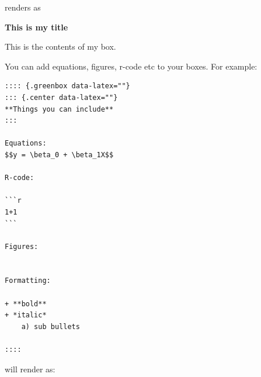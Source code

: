 \documentclass[
  british,
  oneside]{krantz}
\theoremstyle{definition}
\theoremstyle{definition}
\theoremstyle{definition}
\theoremstyle{definition}
\theoremstyle{remark}
\begin{document}
renders as

\begin{palebluebox}

\begin{center}
\textbf{This is my title}

\end{center}

This is the contents of my box.

\end{palebluebox}

You can add equations, figures, r-code etc to your boxes. For example:

\begin{verbatim}
:::: {.greenbox data-latex=""}
::: {.center data-latex=""}
**Things you can include**
:::

Equations: 
$$y = \beta_0 + \beta_1X$$

R-code:

```r
1+1
```

Figures:


Formatting:

+ **bold**
+ *italic*
    a) sub bullets

::::
\end{verbatim}

will render as:
\end{document}
